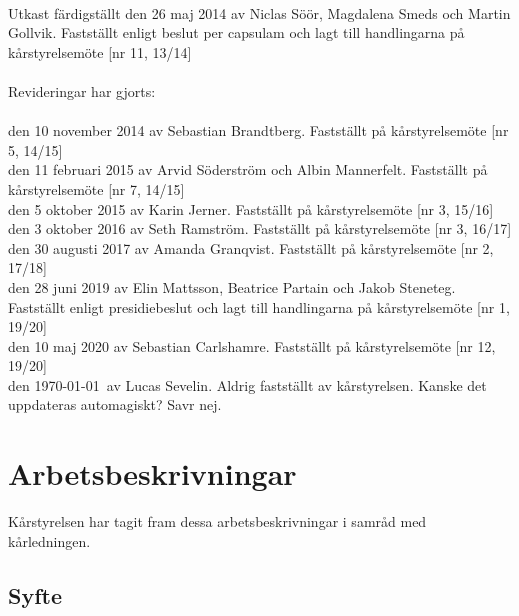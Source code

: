 
\newcommand{\sectionbreak}{\clearpage}


%
%
\vspace*{9 cm}
\noindent
{\huge{}}\\

\vspace{0.2cm}
\noindent
Utkast färdigställt den 26 maj 2014 av Niclas Söör, Magdalena Smeds och
Martin Gollvik. Fastställt enligt beslut per capsulam och lagt till
handlingarna på kårstyrelsemöte {[}nr 11, 13/14{]} \\ \\
Revideringar har gjorts:\\ \\
  den 10 november 2014 av Sebastian Brandtberg. Fastställt på
  kårstyrelsemöte {[}nr 5, 14/15{]} \\
  den 11 februari 2015 av Arvid Söderström och Albin Mannerfelt.
  Fastställt på kårstyrelsemöte {[}nr 7, 14/15{]} \\
  den 5 oktober 2015 av Karin Jerner. Fastställt på kårstyrelsemöte
  {[}nr 3, 15/16{]} \\
  den 3 oktober 2016 av Seth Ramström. Fastställt på kårstyrelsemöte
  {[}nr 3, 16/17{]} \\
  den 30 augusti 2017 av Amanda Granqvist. Fastställt på kårstyrelsemöte
  {[}nr 2, 17/18{]} \\
  den 28 juni 2019 av Elin Mattsson, Beatrice Partain och Jakob
  Steneteg. Fastställt enligt presidiebeslut och lagt till handlingarna
  på kårstyrelsemöte {[}nr 1, 19/20{]} \\
  den 10 maj 2020 av Sebastian Carlshamre. Fastställt på kårstyrelsemöte
  {[}nr 12, 19/20{]} \\
  den \today \ av Lucas Sevelin. Aldrig fastställt av kårstyrelsen. Kanske det uppdateras automagiskt? Savr nej.

%
%
\vspace*{1 mm}
\tableofcontents

\hypertarget{arbetsbeskrivningar}{%
\section{Arbetsbeskrivningar}\label{arbetsbeskrivningar}}

Kårstyrelsen har tagit fram dessa arbetsbeskrivningar i samråd med
kårledningen.

\hypertarget{syfte}{%
\subsection{Syfte}\label{syfte}}

